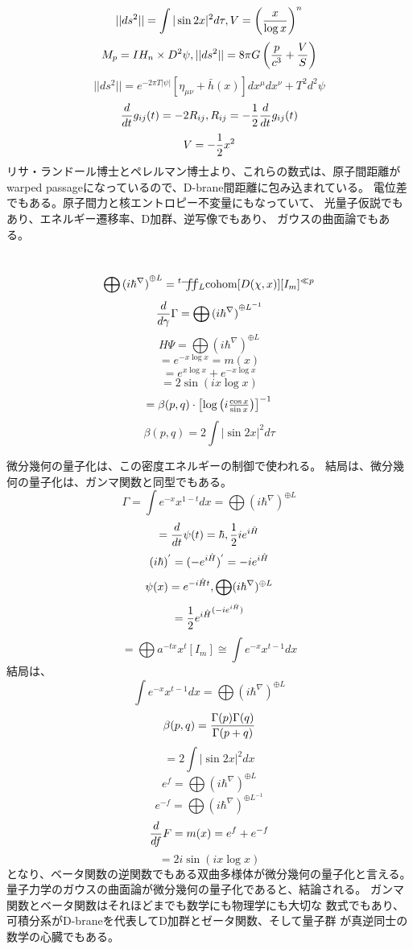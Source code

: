 \documentclass{jsarticle}
\begin{document}
   $$ ||ds^2|| = \int |\sin 2x|^2 d \tau, V = \left({x \over \log x}
   \right)^n  $$
   $$ M_p = IH_n \times D^2 \psi, ||ds^2|| = 8\pi G\left({p \over c^3}
   + {V \over S}\right) $$
   $$ ||ds^2|| = e^{-2 \pi T|\psi|}[\eta_{\mu\nu} + \bar{h}(x)]
   dx^{\mu}dx^{\nu} + T^2 d^2 \psi $$
   $$ {d \over dt}g_{ij}(t) = - 2 R_{ij}, R_{ij} = - {1 \over 2}{d \over dt}
   g_{ij}(t) $$
   $$ V = - {1 \over 2}x^2 $$
   リサ・ランドール博士とペレルマン博士より、これらの数式は、原子間距離が
   warped passageになっているので、D-brane間距離に包み込まれている。
   電位差でもある。原子間力と核エントロピー不変量にもなっていて、
   光量子仮説でもあり、エネルギー遷移率、D加群、逆写像でもあり、
   ガウスの曲面論でもある。

   $$ \bigoplus {(i \hbar^{\nabla})}^{\oplus L} 
    = {}^t \variint_L \mathrm{cohom}[D(\chi,x)][I_m]^{\ll p} $$
   $$ {d \over d \gamma}\Gamma  
      = \bigoplus {(i \hbar^{\nabla})}^{\oplus L^{-1}} $$
   $$ H \Psi = \bigoplus {(i \hbar^{\nabla})}^{\oplus L} $$
   $$ = e^{- x\log x} = m(x) $$
   $$ = e^{x \log x} + e^{- x \log x} $$
   $$ = 2 \sin (i x \log x) $$
   $$ = \beta(p,q) \cdot \begin{bmatrix} {\log 
   \left(i{{\cos x} \over {\sin x}}\right)}\end{bmatrix}^{-1}  $$
   $$ \beta(p,q) = 2 \int |\sin 2x|^2d \tau $$

   微分幾何の量子化は、この密度エネルギーの制御で使われる。
   結局は、微分幾何の量子化は、ガンマ関数と同型でもある。　
   $$ \Gamma = \int e^{-x}x^{1 - t}dx = \bigoplus (i \hbar ^{\nabla})^{\oplus
   L} $$
   $$ = {d \over dt}\psi(t) = \hbar,{1 \over 2}ie^{i\Hat{H}}  $$
   $$ (i\hbar)^{'} = (- e^{i\Hat{H}})^{'} = -ie^{i\Hat{H}} $$
   $$ \psi(x) = e^{-i\Hat{H}t}, \bigoplus(i \hbar ^{\nabla})^{\oplus L} $$
   $$ = {1 \over 2}{e^{i\Hat{H}}}^{(-ie^{i\Hat{H}})} $$
   $$ = \bigoplus a^{-tx}x^{t}[I_m] \cong \int e^{-x}x^{t - 1}dx $$
   結局は、　
   $$ \int e^{-x}x^{t - 1}dx = \bigoplus (i \hbar ^{\nabla})^{\oplus L} $$
   $$ \beta(p,q) = {{\Gamma(p)\Gamma(q)} \over {\Gamma(p + q)}} $$
   $$ = 2 \int |\sin 2x|^2 dx $$
   $$ e^f = \bigoplus (i \hbar ^{\nabla})^{\oplus L} $$
   $$ e^{-f} = \bigoplus {(i \hbar^{\nabla})}^{\oplus L^{-1}} $$
   $$ {d \over df}F = m(x) = e^f + e^{-f} $$
   $$ = 2 i \sin (i x \log x) $$
   となり、ベータ関数の逆関数でもある双曲多様体が微分幾何の量子化と言える。
   量子力学のガウスの曲面論が微分幾何の量子化であると、結論される。
   ガンマ関数とベータ関数はそれほどまでも数学にも物理学にも大切な
   数式でもあり、可積分系がD-braneを代表してD加群とゼータ関数、そして量子群
   が真逆同士の数学の心臓でもある。
\end{document}

